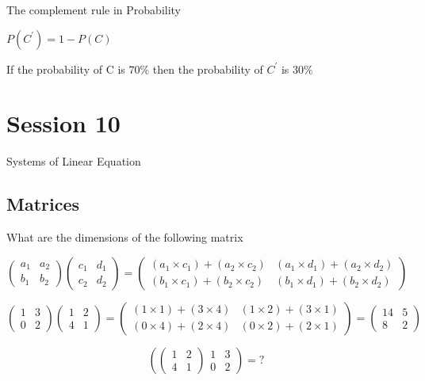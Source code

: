 \documentclass[]{report}
\begin{document}

The complement rule in Probability

$P(C^{\prime}) = 1- P(C)$



If the probability of C is $70 \%$ then the probability of $C^{\prime}$ is $30\%$
\chapter{Session 10 }
Systems of Linear Equation
\section{Matrices}

What are the dimensions of the following matrix


\[ \left(
\begin{array}{cc}
a_1 & a_2 \\ 
b_1 & b_2
\end{array} \right)\left(
\begin{array}{cc}
c_1 & d_1 \\ 
c_2 & d_2
\end{array} \right) = \left(
\begin{array}{cc}
(a_1 \times c_1) + (a_2 \times c_2) & (a_1 \times d_1) + (a_2 \times d_2) \\ 
(b_1 \times c_1) + (b_2 \times c_2) & (b_1 \times d_1) + (b_2 \times d_2)
\end{array} \right) \]

\bigskip
\large{
	\[ \left(
	\begin{array}{cc}
	1 & 3 \\ 
	0 & 2
	\end{array} \right)\left(
	\begin{array}{cc}
	1 & 2 \\ 
	4 & 1
	\end{array} \right) = \left(
	\begin{array}{cc}
	(1 \times 1) + (3 \times 4) & (1 \times 2) + (3 \times 1) \\ 
	(0 \times 4) + (2 \times 4) & (0 \times 2) + (2 \times 1)
	\end{array} \right) = \left(
	\begin{array}{cc}
	14 & 5 \\ 
	8 & 2
	\end{array} \right) \]
}

\[ \left(
\left(
\begin{array}{cc}
1 & 2 \\ 
4 & 1
\end{array} \right)
\begin{array}{cc}
1 & 3 \\ 
0 & 2
\end{array} \right) = ? \]
\end{document}

